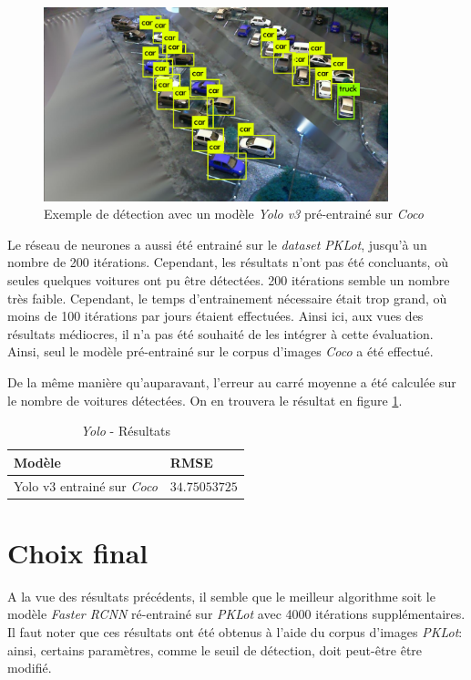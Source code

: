 \begin{figure}[ht]
    \includegraphics[width=10cm]{img/tests/yolo_bb.png}
    \centering
    \caption{Exemple de détection avec un modèle \textit{Yolo v3} pré-entrainé sur \textit{Coco}}
    \label{fig:yolo_bb}
\end{figure} 

Le réseau de neurones a aussi été entrainé sur le \textit{dataset} \textit{PKLot}, jusqu'à un nombre de 200 itérations. Cependant, les résultats n'ont pas été concluants, où seules quelques voitures ont pu être détectées. 200 itérations semble un nombre très faible. Cependant, le temps d'entrainement nécessaire était trop grand, où moins de 100 itérations par jours étaient effectuées. Ainsi ici, aux vues des résultats médiocres, il n'a pas été souhaité de les intégrer à cette évaluation. Ainsi, seul le modèle pré-entrainé sur le corpus d'images \textit{Coco} a été effectué. 

De la même manière qu'auparavant, l'erreur au carré moyenne a été calculée sur le nombre de voitures détectées. On en trouvera le résultat en figure \ref{tab:yolo_results}.

\begin{table}[ht]
\centering
\begin{tabular}{@{}ll@{}}
\toprule
Modèle & RMSE \\ \midrule
Yolo v3 entrainé sur \textit{Coco}  & $34.75053725$ \\ \bottomrule
\end{tabular}
\caption{\textit{Yolo} - Résultats}
\label{tab:yolo_results}
\end{table}

\section{Choix final} \label{tests.final}

A la vue des résultats précédents, il semble que le meilleur algorithme soit le modèle \textit{Faster RCNN} ré-entrainé sur \textit{PKLot} avec 4000 itérations supplémentaires. Il faut noter que ces résultats ont été obtenus à l'aide du corpus d'images \textit{PKLot}: ainsi, certains paramètres, comme le seuil de détection, doit peut-être être modifié. 


